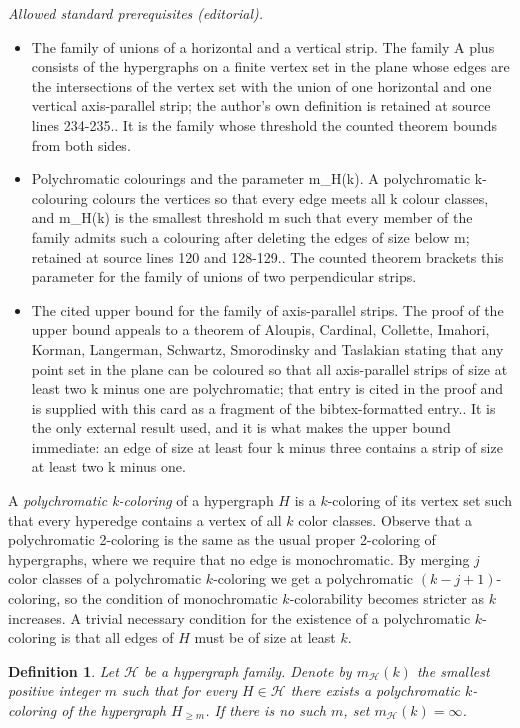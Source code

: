 \documentclass[11pt,oneside]{amsart}
\newtheorem{definition}{Definition}
\begin{document}
\noindent\textit{Allowed standard prerequisites (editorial).}\begin{itemize}
\item The family of unions of a horizontal and a vertical strip. The family A plus consists of the hypergraphs on a finite vertex set in the plane whose edges are the intersections of the vertex set with the union of one horizontal and one vertical axis-parallel strip; the author's own definition is retained at source lines 234-235.. It is the family whose threshold the counted theorem bounds from both sides.
\item Polychromatic colourings and the parameter m\_H(k). A polychromatic k-colouring colours the vertices so that every edge meets all k colour classes, and m\_H(k) is the smallest threshold m such that every member of the family admits such a colouring after deleting the edges of size below m; retained at source lines 120 and 128-129.. The counted theorem brackets this parameter for the family of unions of two perpendicular strips.
\item The cited upper bound for the family of axis-parallel strips. The proof of the upper bound appeals to a theorem of Aloupis, Cardinal, Collette, Imahori, Korman, Langerman, Schwartz, Smorodinsky and Taslakian stating that any point set in the plane can be coloured so that all axis-parallel strips of size at least two k minus one are polychromatic; that entry is cited in the proof and is supplied with this card as a fragment of the bibtex-formatted entry.. It is the only external result used, and it is what makes the upper bound immediate: an edge of size at least four k minus three contains a strip of size at least two k minus one.
\end{itemize}\medskip
A {\it polychromatic k-coloring} of a hypergraph $H$ is a $k$-coloring of its vertex set such that every hyperedge contains a vertex of all $k$ color classes. Observe that a polychromatic 2-coloring is the same as the usual proper 2-coloring of hypergraphs, where we require that no edge is monochromatic. By merging $j$ color classes of a polychromatic $k$-coloring we get a polychromatic $(k-j+1)$-coloring, so the condition of monochromatic $k$-colorability becomes stricter as $k$ increases. A trivial necessary condition for the existence of a polychromatic $k$-coloring is that all edges of $H$ must be of size at least $k$.

\begin{definition} Let $\mathcal{H}$ be a hypergraph family. Denote by $m_\mathcal{H}(k)$ the smallest positive integer $m$ such that for every $H\in\mathcal{H}$ there exists a polychromatic $k$-coloring of the hypergraph $H_{\ge m}$. If there is no such $m$, set $m_{\mathcal{H}}(k)=\infty$.
\end{definition}
\end{document}
